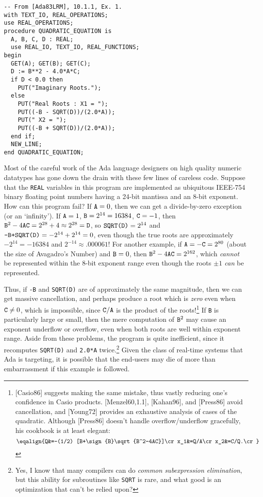 \documentclass[twocolumn,epsf]{snBaker}
\begin{document}
{\small\begin{verbatim}
-- From [Ada83LRM], 10.1.1, Ex. 1.
with TEXT_IO, REAL_OPERATIONS;
use REAL_OPERATIONS;
procedure QUADRATIC_EQUATION is
  A, B, C, D : REAL;
  use REAL_IO, TEXT_IO, REAL_FUNCTIONS;
begin
  GET(A); GET(B); GET(C);
  D := B**2 - 4.0*A*C;
  if D < 0.0 then
    PUT("Imaginary Roots.");
  else
    PUT("Real Roots : X1 = ");
    PUT((-B - SQRT(D))/(2.0*A));
    PUT(" X2 = ");
    PUT((-B + SQRT(D))/(2.0*A));
  end if;
  NEW_LINE;
end QUADRATIC_EQUATION;
\end{verbatim}}
Most of the careful work of the Ada language designers on high quality
numeric datatypes has gone down the drain with these few lines of
careless code.  Suppose that the {\tt REAL} variables in this program are implemented
as ubiquitous IEEE-754 binary floating point numbers having a 24-bit
mantissa and an 8-bit exponent.  How can this program fail?  If
$\hbox{\tt A}=0$, then we can get a divide-by-zero exception (or an `infinity').  If
$\hbox{\tt A}=1$, $\hbox{\tt B}=2^{14}=16384$, $\hbox{\tt C}=-1$, then
$\hbox{\tt B}^2-4\hbox{\tt A}\hbox{\tt C}=2^{28}+4\approx
2^{28}=\hbox{\tt D}$, so $\hbox{\tt SQRT(D)}=2^{14}$ and $\hbox{\tt
-B+SQRT(D)}=-2^{14}+2^{14}=0$, even though the true roots are
approximately $-2^{14}=-16384$ and $2^{-14}\approx .000061$!  For
another example, if $\hbox{\tt A}=-\hbox{\tt C}=2^{80}$ (about the size of Avagadro's Number) and $\hbox{\tt B}=0$, then $\hbox{\tt B}^2-4\hbox{\tt A}\hbox{\tt
C}=2^{162}$, which {\it cannot} be represented within the 8-bit
exponent range even though the roots $\pm 1$ {\it can} be represented.

Thus, if {\tt -B} and {\tt SQRT(D)} are of approximately the same
magnitude, then we can get massive cancellation, and perhaps produce a
root which is {\it zero} even when $\hbox{\tt C}\neq 0$, which is
impossible, since $\hbox{\tt C}/\hbox{\tt A}$ is the product of the
roots!\footnote{[Casio86] suggests making the same mistake, thus vastly reducing
one's confidence in Casio products.  [Menzel60,1.1], [Kahan96], and
[Press86] avoid cancellation, and [Young72] provides an exhaustive
analysis of cases of the quadratic.  Although [Press86] doesn't handle
overflow/underflow gracefully, his cookbook is at least elegant:
$$\eqalign{Q&=-(1/2) [B+\sign{B}\sqrt{B^2-4AC}]\cr
x_1&=Q/A\cr
x_2&=C/Q.\cr}$$} If {\tt B} is particularly large or small, then
the mere computation of $\hbox{\tt B}^2$ may cause an exponent
underflow or overflow, even when both roots are well within exponent
range.  Aside from these problems, the program is quite inefficient,
since it recomputes {\tt SQRT(D)} and {\tt 2.0*A} twice.\footnote{Yes,
I know that many compilers can do {\it common subexpression
elimination}, but this ability for subroutines like {\tt SQRT} is
rare, and what good is an optimization that can't be relied upon?}
Given the class of real-time systems that Ada is targeting, it is
possible that the end-users may die of more than embarrassment if this
example is followed.
\end{document}
